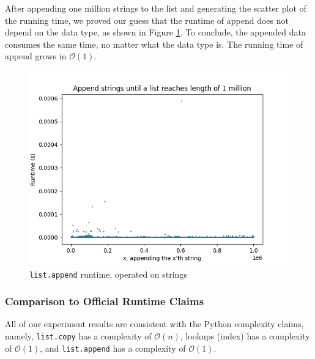 \documentclass[titlepage, 12pt]{article}
\begin{document}
After appending one million strings to the list and generating the scatter plot
of the running time, we proved our guess that the runtime of append does not
depend on the data type, as shown in Figure \ref{fig:append-string}. To
conclude, the appended data consumes the same time, no matter what the data type
is. The running time of append grows in \( \mathcal{O}(1) \).
\begin{figure}[H]
  \includegraphics[width=0.8\linewidth]{append-string.png}
  \centering
  \caption{\texttt{list.append} runtime, operated on strings}
  \label{fig:append-string}
\end{figure}

\subsubsection{Comparison to Official Runtime Claims}

All of our experiment results are consistent with the Python complexity claims,
namely, \texttt{list.copy} has a complexity of \( \mathcal{O}(n) \), lookups
(index) has a complexity of \( \mathcal{O}(1) \), and \texttt{list.append} has a
complexity of \( \mathcal{O}(1) \).
\end{document}
